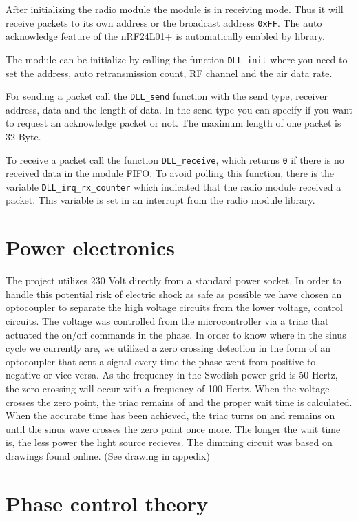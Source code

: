 \documentclass[11pt]{article}
\begin{document}
   After initializing the radio module the module is in receiving mode. Thus it will receive packets to its own address or the broadcast address \texttt{0xFF}. The auto acknowledge feature of the nRF24L01+ is automatically enabled by library.
   
   The module can be initialize by calling the function \texttt{DLL\_init} where you need to set the address, auto retransmission count, RF channel and the air data rate.
   
   For sending a packet call the \texttt{DLL\_send} function with the send type, receiver address, data and the length of data. In the send type you can specify if you want to request an acknowledge packet or not. The maximum length of one packet is 32 Byte.
   
   To receive a packet call the function \texttt{DLL\_receive}, which returns \texttt{0} if there is no received data in the module FIFO. To avoid polling this function, there is the variable \texttt{DLL\_irq\_rx\_counter} which indicated that the radio module received a packet. This variable is set in an interrupt from the radio module library.
   
     \section{Power electronics}
     The project utilizes 230 Volt directly from a standard power socket. In order to handle this potential risk of electric shock as safe as possible we have chosen an optocoupler to separate the high voltage circuits from the lower voltage, control circuits. 
The voltage was controlled from the microcontroller via a triac that actuated the on/off commands in the phase. In order to know where in the sinus cycle we currently are, we utilized a zero crossing detection in the form of  an optocoupler that sent a signal every time the phase went from positive to negative or vice versa. As the frequency in the Swedish power grid is 50 Hertz, the zero crossing will occur with a frequency of 100 Hertz. 
When the voltage crosses the zero point, the triac remains of and the proper wait time is calculated. When the accurate time has been achieved, the triac turns on and remains on until the sinus wave crosses the zero point once more.
The longer the wait time is, the less power the light source recieves.
The dimming circuit was based on drawings found online. (See drawing in appedix)

\section{Phase control theory}
\end{document}
